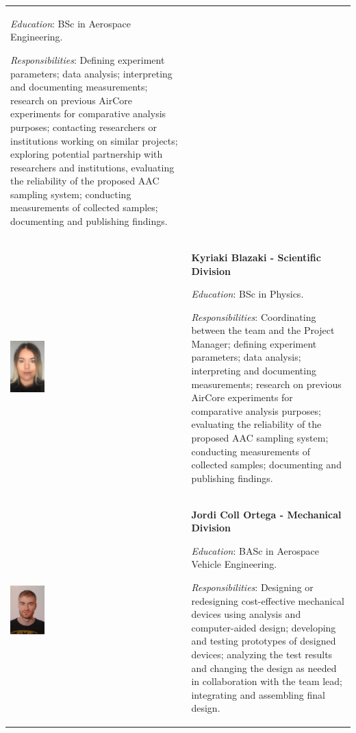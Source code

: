\documentclass[a4paper,12pt,twoside]{article}
\begin{document}
\begin{longtable}[]{m{} m{}}
\smallskip
\textit{Education}: BSc in Aerospace Engineering.

\smallskip
\textit{Responsibilities}: Defining experiment parameters; data analysis; interpreting and documenting measurements; research on previous AirCore experiments for comparative analysis purposes; contacting researchers or institutions working on similar projects; exploring potential partnership with researchers and institutions, evaluating the reliability of the proposed AAC sampling system; conducting measurements of collected samples; documenting and publishing findings. 
\bigskip
\\

\includegraphics[width=0.2\textwidth]{1-introduction/img/kiki-blazaki.jpg} & \textbf{Kyriaki Blazaki - Scientific Division}

\smallskip
\textit{Education}: BSc in Physics.


\smallskip
\textit{Responsibilities}: Coordinating between the team and the Project Manager; defining experiment parameters; data analysis; interpreting and documenting measurements; research on previous AirCore experiments for comparative analysis purposes; evaluating the reliability of the proposed AAC sampling system; conducting measurements of collected samples; documenting and publishing findings. 
\bigskip
\\

\includegraphics[width=0.2\textwidth]{1-introduction/img/jordi-coll-ortega.jpg} & \textbf{Jordi Coll Ortega - Mechanical Division}

\smallskip
\textit{Education}: BASc in Aerospace Vehicle Engineering.

\smallskip
\textit{Responsibilities}: Designing or redesigning cost-effective mechanical devices using analysis and computer-aided design; developing and testing prototypes of designed devices; analyzing the test results and changing the design as needed in collaboration with the team lead; integrating and assembling final design.
\bigskip
\\


\end{longtable}
\end{document}
